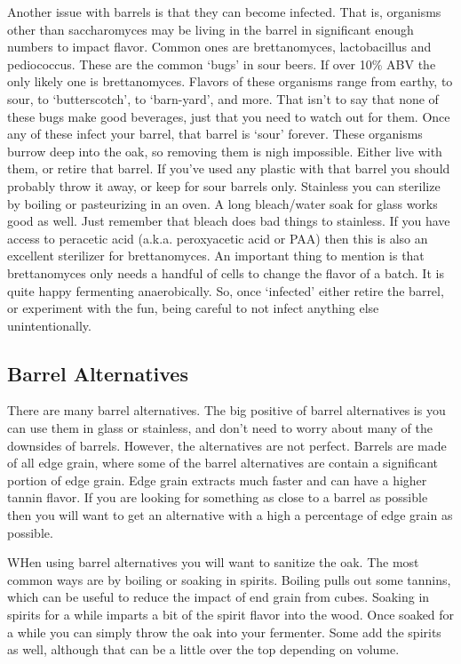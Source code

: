    Another issue with barrels is that they can become infected. That is, organisms other than saccharomyces may be
   living in the barrel in significant enough numbers to impact flavor. Common ones are brettanomyces, lactobacillus
   and pediococcus. These are the common `bugs' in sour beers. If over 10\% ABV the only likely one is brettanomyces.
   Flavors of these organisms range from earthy, to sour, to `butterscotch', to `barn-yard', and more. That isn't to
   say that none of these bugs make good beverages, just that you need to watch out for them.
   Once any of these infect your barrel, that barrel is `sour' forever. These organisms burrow deep into the oak, so
   removing them is nigh impossible. Either live with them, or retire that barrel. If you've used any plastic with that
   barrel you should probably throw it away, or keep for sour barrels only. Stainless you can sterilize by boiling or
   pasteurizing in an oven. A long bleach/water soak for glass works good as well. Just remember that bleach does bad
   things to stainless. If you have access to peracetic acid (a.k.a. peroxyacetic acid or PAA) then this is also an
   excellent sterilizer for brettanomyces. An important thing to mention is that brettanomyces only needs a handful of
   cells to change the flavor of a batch. It is quite happy fermenting anaerobically. So, once `infected' either retire
   the barrel, or experiment with the fun, being careful to not infect anything else unintentionally.


 \subsection{Barrel Alternatives}
  There are many barrel alternatives. The big positive of barrel alternatives is you can use them in glass
  or stainless, and don't need to worry about many of the downsides of barrels. However, the
  alternatives are not perfect. Barrels are made of all edge grain, where some of the barrel alternatives are
  contain a significant portion of edge grain. Edge grain extracts much faster and can have a higher tannin
  flavor. If you are looking for something as close to a barrel as possible then you will want to get an
  alternative with a high a percentage of edge grain as possible.

  WHen using barrel alternatives you will want to sanitize the oak. The most common ways are by boiling 
  or soaking in spirits. Boiling pulls out some tannins, which can be useful to reduce the impact of 
  end grain from cubes. Soaking in spirits for a while imparts a bit of the spirit flavor into the wood. Once
  soaked for a while you can simply throw the oak into your fermenter. Some add the spirits as well, although
  that can be a little over the top depending on volume.

